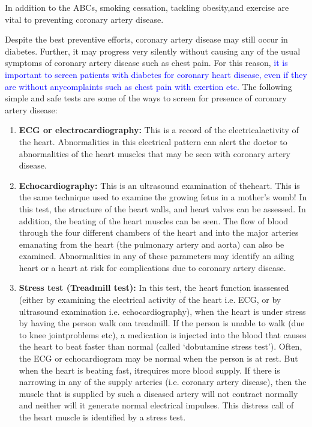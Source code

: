 In addition to the ABCs, smoking cessation, tackling obesity,\break and exercise are vital to preventing coronary artery disease.


Despite the best preventive efforts, coronary artery disease may still occur in diabetes. Further, it may progress very silently without causing any of the usual symptoms of coronary artery disease such as chest pain. For this reason, \textcolor{blue}{it is important to screen patients with dia\-betes for coronary heart disease, even if they are without any\break complaints such as chest pain with exertion etc.} The following simple and safe tests are some of the ways to screen for presence of coronary artery disease:

\clearpage
\begin{enumerate}
\itemsep=0pt
\item \textbf{ECG or electrocardiography:} This is a record of the electrical\break activity of the heart. Abnormalities in this electrical pattern can alert the doctor to abnormalities of the heart muscles that may be seen with coronary artery disease.
\item \textbf{Echocardiography:} This is an ultrasound examination of the\break heart. This is the same technique used to examine the growing fetus in a mother’s womb! In this test, the structure of the heart walls, and heart valves can be assessed. In addition, the beating of the heart muscles can be seen. The flow of blood through the four different chambers of the heart and into the major arteries emanating from the heart (the pulmonary artery and aorta) can also be examined. Abnormalities in any of these parameters may identify an ailing heart or a heart at risk for complications due to coronary artery disease.
\item \textbf{Stress test (Treadmill test):} In this test, the heart function is\break assessed (either by examining the electrical activity of the heart i.e. ECG, or by ultrasound examination i.e. echocardiography), when the heart is under stress by having the person walk on\break a treadmill. If the person is unable to walk (due to knee joint\break pro\-blems etc), a medication is injected into the blood that causes the heart to beat faster than normal (called ‘dobutamine stress test’). Often, the ECG or echocardiogram may be normal when the person is at rest. But when the heart is beating fast, it\break requires more blood supply. If there is narrowing in any of the supply arteries (i.e. coronary artery disease), then the muscle that is supplied by such a diseased artery will not contract normally and neither will it generate normal electrical impulses. This distress call of the heart muscle is identified by a stress test.

\end{enumerate}
